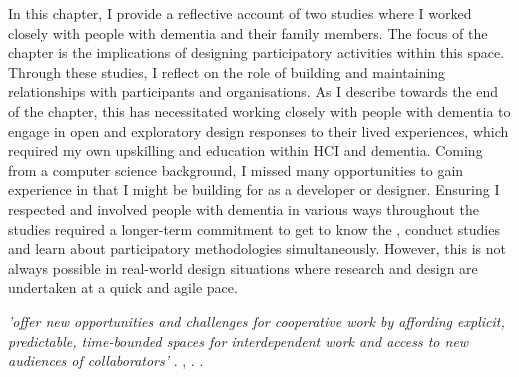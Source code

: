 \newpage
In this chapter, I provide a reflective account of two studies where I worked closely with people with dementia and their family members. The focus of the chapter is  the implications of designing participatory activities within this space. Through these studies, I reflect on the role of building and maintaining relationships with participants and organisations. As I describe towards the end of the chapter, this has necessitated working closely with people with dementia to engage in open and exploratory design responses to their lived experiences, which required my own upskilling and education within HCI and dementia. Coming from a computer science background, I missed many opportunities to gain experience in  that I might be building for as a developer or designer. Ensuring I respected and involved people with dementia in various ways throughout the studies required a longer-term commitment to get to know the , conduct  studies and learn about participatory methodologies simultaneously. However, this is not always possible in real-world design situations where research and design are undertaken at a quick and agile pace. 

 \textit{’offer new opportunities and challenges for cooperative work by affording explicit, predictable, time-bounded spaces for interdependent work and access to new audiences of collaborators’} \citep{filippova_hacking_2017}.  \citep{jones_theres_2015},  \citep{nandi_hackathons_2016}.  \citep{jones_theres_2015}. 
 
